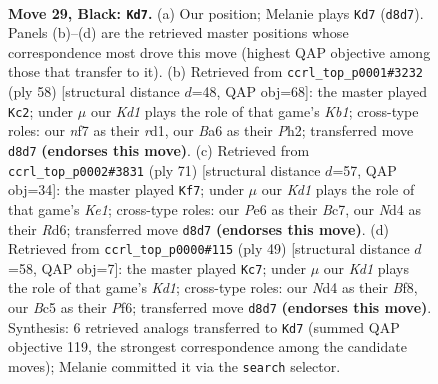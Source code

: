 \documentclass[11pt]{article}
\begin{document}
\clearpage

\begin{figure}[p]\centering
\begin{subfigure}{0.46\textwidth}\centering
\resizebox{\linewidth}{!}{%
\newchessgame
\chessboard[
  setfen={r2k4/5N2/b1p1p3/P1b1P2p/3n1P1P/1p6/3B3K/RN6 b - - 4 29},
  showmover=false,
  pgfstyle=straightmove, color=movearrow, markmove={d8-d7}
]}
\caption{}
\end{subfigure}\hfill
\begin{subfigure}{0.46\textwidth}\centering
\resizebox{\linewidth}{!}{%
\newchessgame
\chessboard[
  setfen={3b2k1/1p5p/5np1/4R1B1/p1N5/P4P2/1P5P/1K1r4 w - - 0 30},
  showmover=false,
  pgfstyle=straightmove, color=movearrow, markmove={b1-c2}
]}
\caption{}
\end{subfigure}
\\[4pt]
\begin{subfigure}{0.46\textwidth}\centering
\resizebox{\linewidth}{!}{%
\newchessgame
\chessboard[
  setfen={4k3/p1b3p1/3r1pp1/1p1n4/4R2P/5NP1/PP1B1P2/5K2 b - - 1 36},
  showmover=false,
  pgfstyle=straightmove, color=movearrow, markmove={e8-f7}
]}
\caption{}
\end{subfigure}\hfill
\begin{subfigure}{0.46\textwidth}\centering
\resizebox{\linewidth}{!}{%
\newchessgame
\chessboard[
  setfen={r2k1b2/5p2/2p2p1p/p1P5/P1NP4/3BP2b/8/R3K3 b Q - 0 25},
  showmover=false,
  pgfstyle=straightmove, color=movearrow, markmove={d8-c7}
]}
\caption{}
\end{subfigure}
\caption{\textbf{Move 29, Black: \texttt{Kd7}.} (a) Our position; Melanie plays \texttt{Kd7} (\texttt{d8d7}). Panels (b)--(d) are the retrieved master positions whose correspondence most drove this move (highest QAP objective among those that transfer to it). (b) Retrieved from \texttt{ccrl\_top\_p0001\#3232} (ply 58) [structural distance $d$=48, QAP obj=68]: the master played \texttt{Kc2}; under $\mu$ our \emph{Kd1} plays the role of that game's \emph{Kb1}; cross-type roles: our \emph{n}f7 as their \emph{r}d1, our \emph{B}a6 as their \emph{P}h2; transferred move \texttt{d8d7} \textbf{(endorses this move)}. (c) Retrieved from \texttt{ccrl\_top\_p0002\#3831} (ply 71) [structural distance $d$=57, QAP obj=34]: the master played \texttt{Kf7}; under $\mu$ our \emph{Kd1} plays the role of that game's \emph{Ke1}; cross-type roles: our \emph{P}e6 as their \emph{B}c7, our \emph{N}d4 as their \emph{R}d6; transferred move \texttt{d8d7} \textbf{(endorses this move)}. (d) Retrieved from \texttt{ccrl\_top\_p0000\#115} (ply 49) [structural distance $d$=58, QAP obj=7]: the master played \texttt{Kc7}; under $\mu$ our \emph{Kd1} plays the role of that game's \emph{Kd1}; cross-type roles: our \emph{N}d4 as their \emph{B}f8, our \emph{B}c5 as their \emph{P}f6; transferred move \texttt{d8d7} \textbf{(endorses this move)}. Synthesis: 6 retrieved analogs transferred to \texttt{Kd7} (summed QAP objective 119, the strongest correspondence among the candidate moves); Melanie committed it via the \texttt{search} selector.}
\label{fig:thought-m57}
\end{figure}
\end{document}

